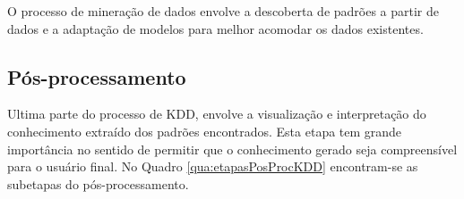 O processo de mineração de dados envolve a descoberta de padrões a partir de dados e a adaptação de modelos para melhor acomodar os dados existentes.

\subsection{Pós-processamento}
\label{subsec:posprocKDD}

Ultima parte do processo de KDD, envolve a visualização e interpretação do conhecimento extraído dos padrões encontrados. Esta etapa tem grande importância no sentido de permitir que o conhecimento gerado seja compreensível para o usuário final. No Quadro \ref{qua:etapasPosProcKDD} encontram-se as subetapas do pós-processamento.

